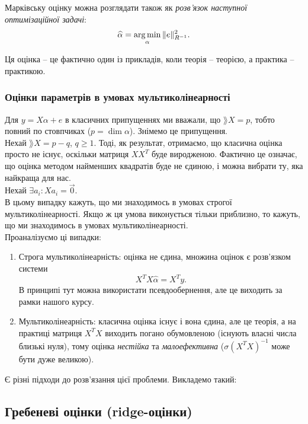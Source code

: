 Марківську оцінку можна розглядати також як \textit{розв’язок наступної оптимізаційної задачі}: \[ \widehat{\alpha} = \operatorname*{arg\,min}_\alpha \|e\|_{R^{-1}}^2. \]

Ця оцінка -- це фактично один із прикладів, коли теорія -- теорією, а практика -- практикою.

\subsubsection{Оцінки параметрів в умовах мультиколінеарності}

Для $y=X\alpha+e$ в класичних припущеннях ми вважали, що $\rang X = p$, тобто повний по стовпчиках ($p = \dim \alpha$). Знімемо це припущення. \\

Нехай $\rang X = p - q$, $q \ge 1$. Тоді, як результат, отримаємо, що класична оцінка просто не існує, оскільки матриця $XX^T$ буде виродженою. Фактично це означає, що оцінка методом найменших квадратів буде не єдиною, і можна вибрати ту, яка найкраща для нас. \\

Нехай $\exists a_i: Xa_i=\vec0$. \\

В цьому випадку кажуть, що ми знаходимось в умовах строгої мультиколінеарності. Якщо ж ця умова  виконується тільки приблизно, то кажуть, що ми знаходимось в умовах мультиколінеарності. \\

Проаналізуємо ці випадки:
\begin{enumerate}
	\item Строга мультиколінеарність: оцінка не єдина, множина оцінок є розв’язком системи \[X^TX\widehat{\alpha}=X^Ty.\] В принципі тут можна використати псевдообернення, але це виходить за рамки нашого курсу.
	\item Мультиколінеарність: класична оцінка існує і вона єдина, але це теорія, а на практиці матриця $X^TX$ виходить погано обумовленою (існують власні числа близькі нуля), тому оцінка \textit{нестійка} та \textit{малоефективна} ($\sigma(X^TX)^{-1}$ може бути дуже великою).
\end{enumerate}

Є різні підходи до розв’язання цієї проблеми. Викладемо такий:

\subsection{Гребеневі оцінки (ridge-оцінки)}

